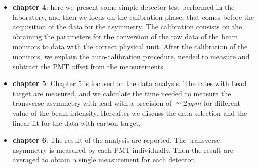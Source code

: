 \begin{itemize}
\item \textbf{chapter 4}: here we present some simple detector test performed in the laboratory, and then we focus on the calibration phase, that comes before the acquisition of the data for the asymmetry. The calibration consists on the obtaining the parameters for the conversion of the raw data of the beam monitors to data with the correct physical unit. After the calibration of the monitors, we explain the auto-calibration procedure, needed to measure and subtract the PMT offset from the measurements.
\item \textbf{chapter 5}: Chapter 5 is focused on the data analysis. The rates with Lead target are measured, and we calculate the time needed to measure the transverse asymmetry with lead with a precision of $\simeq 2 \, ppm$ for different value of the beam intensity. Hereafter we discuss the data selection and the linear fit for the data with carbon target.
\item \textbf{chapter 6}: The result of the analysis are reported. The transverse asymmetry is measured by each PMT individually. Then the result are averaged  to obtain a single measurement for each detector.  
\end{itemize}
